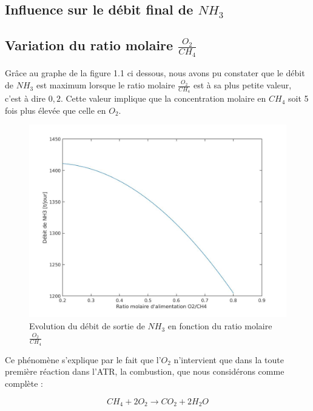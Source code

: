 \documentclass[12pt]{report}
\begin{document}
{\textcolor{carmine}{\chapter{Influence sur le débit final de $NH_3$}}}



\section{Variation du ratio molaire $\frac{O_2}{CH_4}$}

Grâce au graphe de la figure 1.1 ci dessous, nous avons pu constater que le débit de $NH_3$ est maximum lorsque le ratio molaire $\frac{O_2}{CH_4}$ est à sa plus petite valeur, c'est à dire $0,2$. Cette valeur implique que la concentration molaire en $CH_4$ soit 5 fois plus élevée que celle en $O_2$.

\begin{figure}[H]
\begin{center}
\includegraphics[scale=0.3]{debit_NH3_ratio_O2}
\caption{Evolution du débit de sortie de $NH_3$ en fonction du ratio molaire $\frac{O_2}{CH_4}$}
\end{center}
\end{figure}

Ce phénomène s'explique par le fait que l'$O_2$ n'intervient que dans la toute première réaction dans l'ATR, la combustion, que nous considérons comme complète :

\begin{equation}
 CH_4 + 2O_2 \rightarrow CO_2 + 2H_2O
\end{equation}
\end{document}
